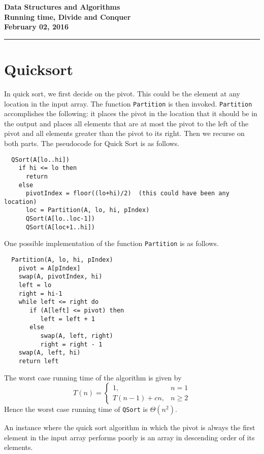 \documentclass[11pt,twoside]{article}
\newcommand{\coursetitle}{Data Structures and Algorithms}
\newcommand{\docdate}{February 02, 2016}
\newcommand{\duedate}{February 02, 2016}
\newcommand{\doctitle}{Running time, Divide and Conquer}
\newcommand{\student}{PUT YOUR NAME HERE}
\begin{document}
\thispagestyle{empty}

\begin{center}
\Large\bf\coursetitle\\[2pt]\doctitle\\ \large\docdate
\end{center}
\vspace*{0.10in}

\hrule
\section*{Quicksort}
In quick sort, we first decide on the pivot. This could be the element
at any
location in the input array. The function \texttt{Partition} is then
invoked. \texttt{Partition} accomplishes the following: it places the
pivot in the location that it should be in the output and places all
elements that are at most the pivot to the left of the pivot and all
elements greater than the pivot to its right. Then we recurse on both
parts. The pseudocode for Quick Sort is as follows. 
\begin{verbatim}
  QSort(A[lo..hi])
    if hi <= lo then
      return
    else
      pivotIndex = floor((lo+hi)/2)  (this could have been any location)
      loc = Partition(A, lo, hi, pIndex)
      QSort(A[lo..loc-1])
      QSort(A[loc+1..hi])     
\end{verbatim} 

One possible implementation of the function \texttt{Partition} is as follows.
\begin{verbatim}
  Partition(A, lo, hi, pIndex)
    pivot = A[pIndex]
    swap(A, pivotIndex, hi)
    left = lo
    right = hi-1
    while left <= right do
       if (A[left] <= pivot) then
          left = left + 1
       else
          swap(A, left, right)
          right = right - 1
    swap(A, left, hi)
    return left
\end{verbatim}

The worst case running time of the algorithm is given by
\[
T(n) = \left\{ \begin{array}{ll}
       1, &  n=1\\
       T(n-1) + cn, &  n \geq 2 
      \end{array} \right.
\]
Hence the worst case running time of \texttt{QSort} is $\Theta(n^2)$.

An instance where the quick sort algorithm in which the pivot is
always the first element in the input array performs poorly is an
array in descending order of its elements.
 
\end{document}
